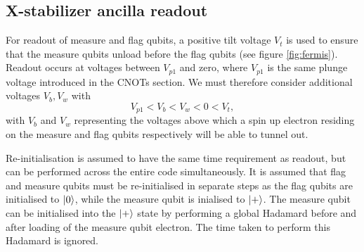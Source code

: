 \documentclass[../Thesis.tex]{subfiles}
\begin{document}







\subsection{X-stabilizer ancilla readout}
For readout of measure and flag qubits, a positive tilt voltage $V_t$ is used to ensure that the measure qubits unload before the flag qubits (see figure \ref{fig:fermis}). Readout occurs at voltages between $V_{p1}$ and zero, where $V_{p1}$ is the same plunge voltage introduced in the CNOTs section. We must therefore consider additional voltages $V_b,V_w$ with 
\begin{equation}
    V_{p1}<V_b<V_w<0<V_t,
\end{equation}
with $V_b$ and $V_w$ representing the voltages above which a spin up electron residing on the measure and flag qubits respectively will be able to tunnel out. 

Re-initialisation is assumed to have the same time requirement as readout, but can be performed across the entire code simultaneously. It is assumed that flag and measure qubits must be re-initialised in separate steps as the flag qubits are initialised to $\ket{0}$, while the measure qubit is inialised to $\ket{+}$. The measure qubit can be initialised into the $\ket{+}$ state by performing a global Hadamard before and after loading of the measure qubit electron. The time taken to perform this Hadamard is ignored.
\end{document}
